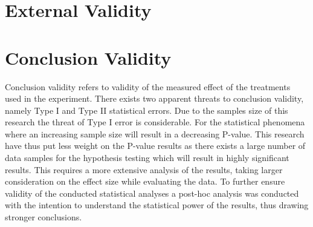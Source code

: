 


\section{External Validity}
\section{Conclusion Validity}

Conclusion validity refers to validity of the measured effect of the treatments used in the experiment. There exists two apparent threats to conclusion validity, namely Type I and Type II statistical errors. Due to the samples size of this research the threat of Type I error is considerable. For the statistical phenomena where an increasing sample size will result in a decreasing P-value. This research have thus put less weight on the P-value results as there exists a large number of data samples for the hypothesis testing \cite{kampenes2007systematic} which will result in highly significant results. This requires a more extensive analysis of the results, taking larger consideration on the effect size while evaluating the data. To further ensure validity of the conducted statistical analyses a post-hoc analysis was conducted with the intention to understand the statistical power of the results, thus drawing stronger conclusions.\\




